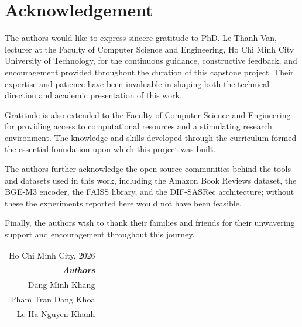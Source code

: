 \chapter*{Acknowledgement}

The authors would like to express sincere gratitude to PhD. Le Thanh Van, lecturer at the Faculty of Computer Science and Engineering, Ho Chi Minh City University of Technology, for the continuous guidance, constructive feedback, and encouragement provided throughout the duration of this capstone project.
Their expertise and patience have been invaluable in shaping both the technical direction and academic presentation of this work.

Gratitude is also extended to the Faculty of Computer Science and Engineering for providing access to computational resources and a stimulating research environment.
The knowledge and skills developed through the curriculum formed the essential foundation upon which this project was built.

The authors further acknowledge the open-source communities behind the tools and datasets used in this work, including the Amazon Book Reviews dataset, the BGE-M3 encoder, the FAISS library, and the DIF-SASRec architecture; without these the experiments reported here would not have been feasible.

Finally, the authors wish to thank their families and friends for their unwavering support and encouragement throughout this journey.

\vspace{2cm}

\begin{flushright}
\begin{tabular}{r}
    Ho Chi Minh City, 2026 \\
    \textit{\textbf{Authors}} \\
    Dang Minh Khang \\
    Pham Tran Dang Khoa \\
    Le Ha Nguyen Khanh
\end{tabular}
\end{flushright}

